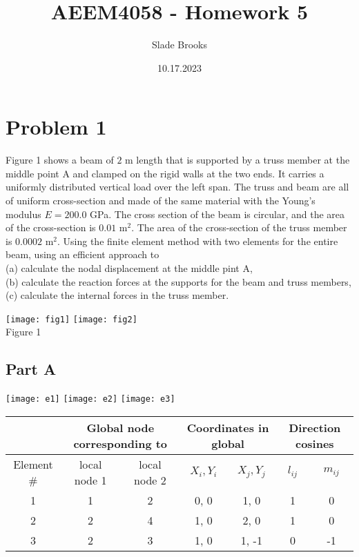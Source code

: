 \documentclass{article}
\title{AEEM4058 - Homework 5}
\author{Slade Brooks}
\date{10.17.2023}
\begin{document}
\maketitle

\section*{Problem 1}
Figure 1 shows a beam of $2$ m length that is supported by a truss member at
the middle point A and clamped on the rigid walls at the two ends. It carries
a uniformly distributed vertical load over the left span. The truss and beam
are all of uniform cross-section and made of the same material with the
Young’s modulus $E=200.0$ GPa. The cross section of the beam is circular, and
the area of the cross-section is $0.01$ m$^2$. The area of the cross-section of
the truss member is $0.0002$ m$^2$. Using the finite element method with two
elements for the entire beam, using an efficient approach to \\
(a) calculate the nodal displacement at the middle pint A, \\
(b) calculate the reaction forces at the supports for the beam and truss
members, \\
(c) calculate the internal forces in the truss member.

\begin{center}
    \texttt{[image: fig1]} \texttt{[image: fig2]}\\
    Figure 1
\end{center}

\subsection*{Part A}
\begin{center}
    \texttt{[image: e1]} \texttt{[image: e2]}
    \texttt{[image: e3]}
\end{center}
\begin{tabular}{|c|c|c|c|c|c|c|}
    \hline
    & \multicolumn{2}{|c|}{Global node corresponding to} &
    \multicolumn{2}{|c|}{Coordinates in global} & 
    \multicolumn{2}{|c|}{Direction cosines} \\
    \hline
    Element \# & local node 1 & local node 2 & $X_i, Y_i$ & $X_j, Y_j$ & $l_{ij}$ & $m_{ij}$ \\
    \hline
    1 & 1 & 2 & 0, 0 & 1, 0 & 1 & 0 \\
    2 & 2 & 4 & 1, 0 & 2, 0 & 1 & 0 \\
    3 & 2 & 3 & 1, 0 & 1, -1 & 0 & -1 \\
    \hline
\end{tabular}
\end{document}
